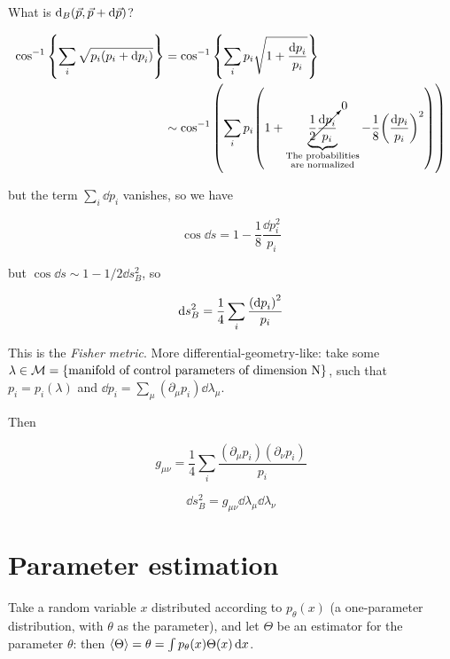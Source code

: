 What is \( \dd _{B} \qty(\vec{p} , \vec{p} + \dd{\vec{p}}) \)?

\begin{align}
  \cos ^{-1} \qty{\sum_i \sqrt{p_i(p_i + \dd{p}_i)}}
  &= \cos ^{-1} \qty{\sum_i p_i \sqrt{1 + \frac{\dd{p}_i }{p_i}}}  \\
  &\sim \cos ^{-1} \qty(\sum_i p_i \qty(1 + \underbrace{\cancelto{0}{\frac{1}{2} \frac{\dd{p}_i}{p_i}}}_{\substack{\text{The probabilities}\\ \text{are normalized}}}     - \frac{1}{8} \qty(\frac{\dd{p_i}}{p_i})^{2} ))
\end{align}

but the term \( \sum_i \dd{p}_i \) vanishes, so we have

\begin{equation}
  \cos \dd{s} = 1 - \frac{1}{8}\frac{\dd{p}_i ^{2} }{p_i}
\end{equation}

but \( \cos \dd{s} \sim 1 - 1/2 \dd{s}^{2} _{B}  \), so

\begin{equation} \label{eq:fisher-metric}
  \dd{s}^{2}_{B}  = \frac{1}{4} \sum_i  \frac{\qty(\dd{p}_i)^{2} }{p_i}
\end{equation}

This is the \emph{Fisher metric}. More differential-geometry-like: take some \( \lambda \in \mathcal{M} = \qty{\text{manifold of control parameters of dimension N}} \), such that \( p_i = p_i(\lambda) \) and  \( \dd{p}_i = \sum_\mu (\partial_\mu p_i) \dd{\lambda_\mu} \).

Then

\begin{equation}
  g _{\mu \nu} = \frac{1}{4} \sum_i \frac{(\partial_\mu p_i)(\partial_\nu p_i)}{p_i}
\end{equation}

\begin{equation}
  \dd{s}_B ^2 = g _{\mu \nu} \dd{\lambda}_\mu \dd{\lambda}_\nu
\end{equation}

\section{Parameter estimation}

Take a random variable \( x \) distributed according to \(p_\theta (x)\) (a one-parameter distribution, with \(\theta\) as the parameter), and let \(\Theta\) be an estimator for the parameter \(\theta\): then \( \expval{\Theta} = \theta = \int  p_\theta(x) \Theta(x) \dd{x}  \).

